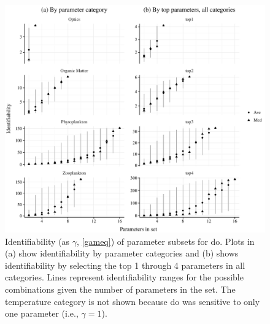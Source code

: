 \documentclass[letterpaper,12pt,oneside]{article}\usepackage[]{graphicx}\usepackage[]{color}
\makeatletter
\def\maxwidth{ %
  \ifdim\Gin@nat@width>\linewidth
    \linewidth
  \else
    \Gin@nat@width
  \fi
}
\makeatother
\begin{document}
\begin{figure}[!ht]

{\centering \includegraphics[width=\maxwidth]{figs/identbox-1} 

}

\caption{Identifiability (as $\gamma$, \cref{gameq}) of parameter subsets for \ac{do}.  Plots in (a) show identifiability by parameter categories and (b) shows identifiability by selecting the top 1 through 4 parameters in all categories.  Lines represent identifiability ranges for the possible combinations given the number of parameters in the set.  The temperature category is not shown because \ac{do} was sensitive to only one parameter (i.e., $\gamma = 1$).}\label{fig:identbox}
\end{figure}
\end{document}
